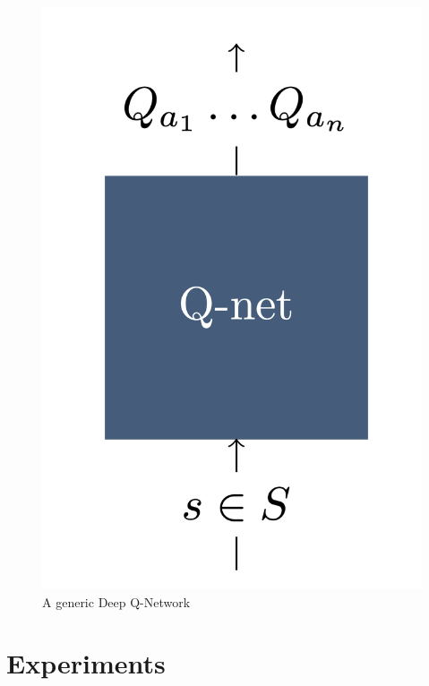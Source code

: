\documentclass[10pt,twocolumn,letterpaper]{article}
\begin{document}
\begin{figure}[h]
\begin{center}
\includegraphics[scale=0.15]{resources/generalQnetwork.png}
\end{center}
\vspace{-0.2em}
\caption{A generic Deep Q-Network}
\label{fig:genericDQN}
\end{figure}

\section{Experiments}
\end{document}
